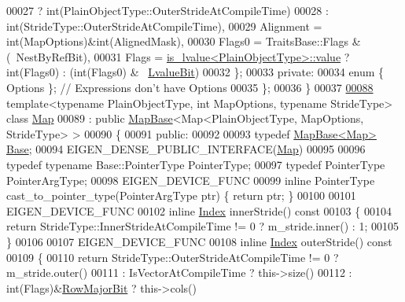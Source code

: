 \begin{DoxyCode}
00027                              ? int(PlainObjectType::OuterStrideAtCompileTime)
00028                              : int(StrideType::OuterStrideAtCompileTime),
00029     Alignment = int(MapOptions)&int(AlignedMask),
00030     Flags0 = TraitsBase::Flags & (~NestByRefBit),
00031     Flags = \hyperlink{struct_eigen_1_1internal_1_1is__lvalue}{is\_lvalue<PlainObjectType>::value} ? \textcolor{keywordtype}{int}(Flags0) : (int(Flags0)
       & ~\hyperlink{group__flags_gae2c323957f20dfdc6cb8f44428eaec1a}{LvalueBit})
00032   \};
00033 \textcolor{keyword}{private}:
00034   \textcolor{keyword}{enum} \{ Options \}; \textcolor{comment}{// Expressions don't have Options}
00035 \};
00036 \}
00037 
\hyperlink{group___core___module}{00088} \textcolor{keyword}{template}<\textcolor{keyword}{typename} PlainObjectType, \textcolor{keywordtype}{int} MapOptions, \textcolor{keyword}{typename} Str\textcolor{keywordtype}{id}eType> \textcolor{keyword}{class }
      \hyperlink{group___core___module_class_eigen_1_1_map}{Map}
00089   : \textcolor{keyword}{public} \hyperlink{class_eigen_1_1_map_base}{MapBase}<Map<PlainObjectType, MapOptions, StrideType> >
00090 \{
00091   \textcolor{keyword}{public}:
00092 
00093     \textcolor{keyword}{typedef} \hyperlink{class_eigen_1_1_map_base}{MapBase<Map>} \hyperlink{class_eigen_1_1_map_base}{Base};
00094     EIGEN\_DENSE\_PUBLIC\_INTERFACE(\hyperlink{group___core___module_class_eigen_1_1_map}{Map})
00095 
00096     \textcolor{keyword}{typedef} \textcolor{keyword}{typename} Base::PointerType PointerType;
00097     \textcolor{keyword}{typedef} PointerType PointerArgType;
00098     EIGEN\_DEVICE\_FUNC
00099     \textcolor{keyword}{inline} PointerType cast\_to\_pointer\_type(PointerArgType ptr) \{ \textcolor{keywordflow}{return} ptr; \}
00100 
00101     EIGEN\_DEVICE\_FUNC
00102     \textcolor{keyword}{inline} \hyperlink{namespace_eigen_a62e77e0933482dafde8fe197d9a2cfde}{Index} innerStride()\textcolor{keyword}{ const}
00103 \textcolor{keyword}{    }\{
00104       \textcolor{keywordflow}{return} StrideType::InnerStrideAtCompileTime != 0 ? m\_stride.inner() : 1;
00105     \}
00106 
00107     EIGEN\_DEVICE\_FUNC
00108     \textcolor{keyword}{inline} \hyperlink{namespace_eigen_a62e77e0933482dafde8fe197d9a2cfde}{Index} outerStride()\textcolor{keyword}{ const}
00109 \textcolor{keyword}{    }\{
00110       \textcolor{keywordflow}{return} StrideType::OuterStrideAtCompileTime != 0 ? m\_stride.outer()
00111            : IsVectorAtCompileTime ? this->size()
00112            : int(Flags)&\hyperlink{group__flags_gae4f56c2a60bbe4bd2e44c5b19cbe8762}{RowMajorBit} ? this->cols()

\end{DoxyCode}
